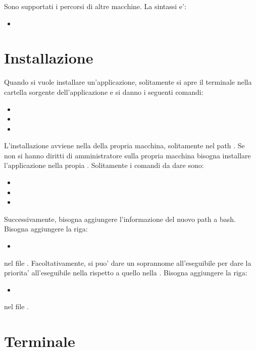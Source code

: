 Sono supportati i percorsi di altre macchine. La sintassi e':
\begin{itemize}
\item[] 
\end{itemize}

\section{Installazione}

Quando si vuole installare un'applicazione, solitamente si apre il terminale nella cartella sorgente dell'applicazione e si danno i seguenti comandi:
\begin{itemize}
\item[\bbox] 
\item[\bbox] 
\item[\bbox] 
\end{itemize}
L'installazione avviene nella  della propria macchina, solitamente nel path . Se non si hanno diritti di amministratore sulla propria macchina bisogna installare l'applicazione nella propia . Solitamente i comandi da dare sono:
\begin{itemize}
\item[\bbox] 
\item[\bbox] 
\item[\bbox] 
\end{itemize}
Successivamente, bisogna aggiungere l'informazione del nuovo path a bash. Bisogna aggiungere la riga:
\begin{itemize}
\item[] 
\end{itemize}
nel file . Facoltativamente, si puo' dare un soprannome all'eseguibile per dare la priorita' all'eseguibile nella  rispetto a quello nella . Bisogna aggiungere la riga:
\begin{itemize}
\item[] 
\end{itemize}
nel file .

\section{Terminale}


